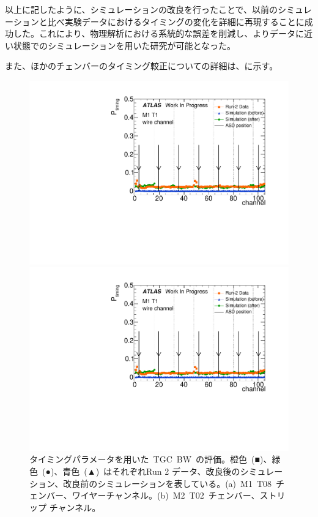 以上に記したように、シミュレーションの改良を行ったことで、以前のシミュレーションと比べ実験データにおけるタイミングの変化を詳細に再現することに成功した。これにより、物理解析における系統的な誤差を削減し、よりデータに近い状態でのシミュレーションを用いた研究が可能となった。

また、ほかのチェンバーのタイミング較正についての詳細は、に示す。

\begin{figure}[H]
	\begin{minipage}{0.49\hsize}
	\centering
	\includegraphics[width=\textwidth,page=10]{img/pdf5/master_timingplot_comp.pdf}
	\subcaption{}
	\end{minipage}
	\begin{minipage}{0.49\hsize}
	\centering
	\includegraphics[width=\textwidth,page=13]{img/pdf5/master_timingplot_comp.pdf}
	\subcaption{}
	\end{minipage}
	\caption[タイミングパラメータを用いた~TGC~BW~の評価]{タイミングパラメータを用いた~TGC~BW~の評価。橙色~(■)、緑色~(●)、青色~(▲)~はそれぞれRun 2 データ、改良後のシミュレーション、改良前のシミュレーションを表している。(a)~M1~T08~チェンバー、ワイヤーチャンネル。(b)~M2~T02~チェンバー、ストリップ チャンネル。}
	\label{fig:timingPlotBW}
\end{figure}

